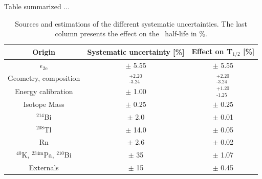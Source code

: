 \documentclass[main.tex]{subfiles}
\begin{document}

\NI Table summarized ...


\begin{table}
\centering
\begin{tabular}{c|c|c}
Origin                                   & Systematic uncertainty [\%] & Effect on T$_{\text{1/2}}$ [\%] \\[0.1cm]
\toprule
$\epsilon_{\text{2e}}$                   & $\pm$ 5.55                       & $\pm$ 5.55 \\[0.1cm]
\midrule
Geometry, composition                    & $^{\text{+2.20}}_{\text{-3.24}}$ & $^{\text{+2.20}}_{\text{-3.24}}$ \\[0.1cm]
\midrule
Energy calibration                       & $\pm$ 1.00                       & $^{\text{+1.20}}_{\text{-1.25}}$ \\[0.1cm]
\midrule
Isotope Mass                             & $\pm$ 0.25                       & $\pm$ 0.25 \\[0.1cm]
\midrule
$^{\text{214}}$Bi                        & $\pm$ 2.0                        & $\pm$ 0.01 \\[0.1cm]
\midrule
$^{\text{208}}$Tl                        & $\pm$ 14.0                       & $\pm$ 0.05 \\[0.1cm]
\midrule
Rn                                       & $\pm$ 2.6                        & $\pm$ 0.02 \\[0.1cm]
\midrule
$^{\text{40}}$K, $^{\text{234m}}$Pa, $^{\text{210}}$Bi & $\pm$ 35           & $\pm$ 1.07 \\[0.1cm]
\midrule
Externals                                & $\pm$ 15                         & $\pm$ 0.45 \\[0.1cm]
\bottomrule
\end{tabular}
\caption{Sources and estimations of the different systematic uncertainties. The last column presents the effect on the \Cd~half-life in \%.}
\label{Table:SystCurrent}
\end{table}

\end{document}

